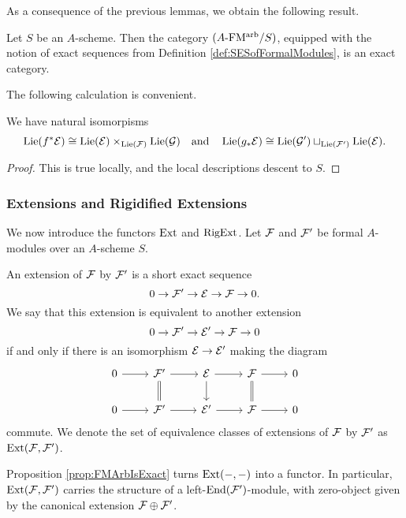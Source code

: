 \documentclass[../main.tex]{subfiles}
\begin{document}
As a consequence of the previous lemmas, we obtain the following result.
\begin{prop}\label{prop:FMArbIsExact}
  Let $S$ be an $A$-scheme. Then
  the category ${({A}\text-\allowbreak\mathrm{FM^{arb}}/{S})}$, equipped with the notion of exact sequences
  from Definition \ref{def:SESofFormalModules}, is an exact category. 
\end{prop}

The following calculation is convenient.
\begin{lem}\label{lem:LieAlgebrasOfPBandPFW}
  We have natural isomorpisms 
  \begin{equation*}
    \operatorname{Lie}(f^* \mathcal{E}) \cong \operatorname{Lie}(\mathcal{E}) \times_{\operatorname{Lie}(\mathcal{F})} \operatorname{Lie}(\mathcal{G}) \quad \text{and}
    \quad \operatorname{Lie}(g_* \mathcal{E}) \cong \operatorname{Lie}(\mathcal{G}') \sqcup_{\operatorname{Lie}(\mathcal{F}')} \operatorname{Lie}(\mathcal{E}).
  \end{equation*}
\begin{proof}
  This is true locally, and the local descriptions descent to $S$.
\end{proof}
\end{lem}


\subsubsection{Extensions and Rigidified Extensions} %
\label{ssub:Extensions and Rigidified Extensions}
We now introduce the functors $\operatorname{Ext}$ and $\operatorname {RigExt}$. 
Let $\mathcal{F}$ and $\mathcal{F}'$ be formal $A$-modules over an $A$-scheme $S$.
\begin{defi}[Extension]
  An extension of $\mathcal{F}$ by $\mathcal{F}'$ is a short exact sequence 
  \begin{equation*}
    0 \to \mathcal{F}' \to \mathcal{E} \to \mathcal{F} \to 0.
  \end{equation*}
  We say that this extension is equivalent to another extension 
  \begin{equation*}
    0 \to \mathcal{F}' \to \mathcal{E}' \to \mathcal{F} \to 0
  \end{equation*}
  if and only if there is an isomorphism $\mathcal{E} \to \mathcal{E}'$ making the diagram 
  \begin{equation*}
    \begin{tikzcd}[ampersand replacement=\&]
    	0 \& {\cF'} \& \cE \& \cF \& 0 \\
    	0 \& {\cF'} \& {\cE'} \& \cF \& 0
    	\arrow[from=1-1, to=1-2]
    	\arrow[from=1-2, to=1-3]
    	\arrow[Rightarrow, no head, from=1-2, to=2-2]
    	\arrow[from=1-3, to=1-4]
    	\arrow[from=1-3, to=2-3]
    	\arrow[from=1-4, to=1-5]
    	\arrow[Rightarrow, no head, from=1-4, to=2-4]
    	\arrow[from=2-1, to=2-2]
    	\arrow[from=2-2, to=2-3]
    	\arrow[from=2-3, to=2-4]
    	\arrow[from=2-4, to=2-5]
    \end{tikzcd}
  \end{equation*}
  commute. We denote the set of equivalence classes of extensions of $\mathcal{F}$ by
  $\mathcal{F}'$ as $\operatorname{Ext}(\mathcal{F}, \mathcal{F}')$. 
\end{defi}
Proposition \ref{prop:FMArbIsExact} turns $\operatorname{Ext}(-,-)$ into a functor.
In particular, $\operatorname{Ext}(\mathcal{F},\mathcal{F}')$ carries the structure of a
left-$\operatorname{End}(\mathcal{F}')$-module,
with zero-object given by the canonical extension $\mathcal{F} \oplus \mathcal{F}'$.
\end{document}
